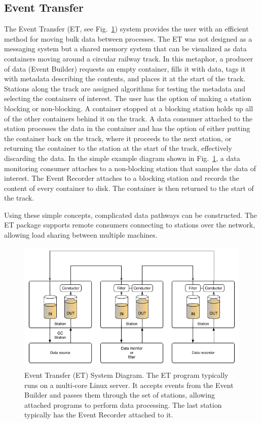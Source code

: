 \subsection{Event Transfer}

The Event Transfer (ET, see Fig.~\ref{fig:et_diagram}) system provides the user with an efficient method for moving bulk data between processes. The ET was not designed as a messaging system but a shared memory system that can be visualized as data containers moving around a circular railway track. In this metaphor, a producer of data (Event Builder) requests an empty container, fills it with data, tags it with metadata describing the contents, and places it at the start of the track. Stations along the track are assigned algorithms for testing the metadata and selecting the containers of interest. The user has the option of making a station blocking or non-blocking. A container stopped at a blocking station holds up all of the other containers behind it on the track. A data consumer attached to the station processes the data in the container and has the option of either putting the container back on the track, where it proceeds to the next station, or returning the container to the station at the start of the track, effectively discarding the data. In the simple example diagram shown in Fig.~\ref{fig:et_diagram}, a data monitoring consumer attaches to a non-blocking station that samples the data of interest. The Event Recorder attaches to a blocking station and records the content of every container to disk. The container is then returned to the start of the track.

Using these simple concepts, complicated data pathways can be constructed. The ET package supports remote consumers connecting to stations over the network, allowing load sharing between multiple machines. 

\begin{figure}[hbt]
	\centering
	\includegraphics[width=1.0\columnwidth,keepaspectratio]{img/et_diagram.png}
	\caption{Event Transfer (ET) System Diagram. The ET program typically runs on a multi-core Linux server. It accepts events from the Event Builder and passes them through the set of stations, allowing attached programs to perform data processing. The last station typically has the Event Recorder attached to it.}
	\label{fig:et_diagram}
\end{figure}

